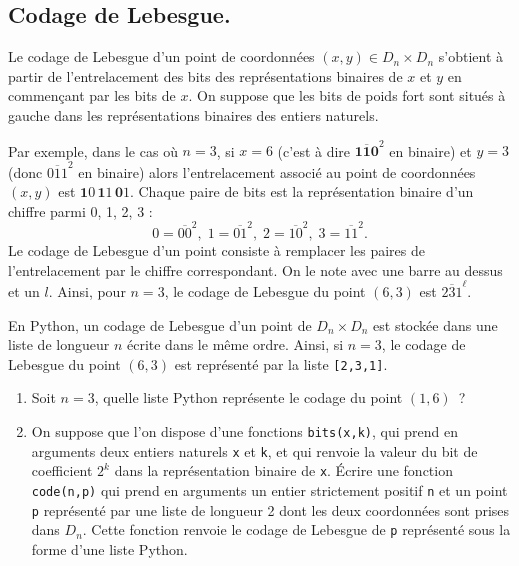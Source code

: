 \subsection{Codage de Lebesgue.}
Le codage de Lebesgue d'un point de coordonn\'ees $(x,y)\in D_n\times D_n$ s'obtient à partir de l'entrelacement des bits des repr\'esentations binaires de $x$ et $y$ en commençant par les bits de $x$.
On suppose que les bits de poids fort sont situ\'es \`a gauche dans les repr\'esentations binaires des entiers naturels.

Par exemple, dans le cas où $n=3$, si $x = 6$ (c'est à dire $\overline{\mathbf{110}}^2$ en binaire) et $y = 3$ (donc $\overline{011}^2$ en binaire) alors l'entrelacement associé au point de coordonn\'ees $(x,y)$ est $\mathbf{1}0\, \mathbf{1}1\, \mathbf{0}1$. \newline
Chaque paire de bits est la représentation binaire d'un chiffre parmi 0, 1, 2, 3 :
\[
 0 = \overline{00}^2, \; 1 = \overline{01}^2, \; 2 = \overline{10}^2, \;  3 = \overline{11}^2.
\]
Le codage de Lebesgue d'un point consiste à remplacer les paires de l'entrelacement par le chiffre correspondant. On le note avec une barre au dessus et un $l$.\newline
Ainsi, pour $n=3$, le codage de Lebesgue du point $(6,3)$ est $\overline{231}^\ell$.

En Python, un codage de Lebesgue d'un point de $D_n\times D_n$ est stock\'ee dans une liste de longueur $n$ écrite dans le même ordre. Ainsi, si $n=3$, le codage de Lebesgue du point $(6,3)$ est repr\'esent\'e par la liste {\tt [2,3,1]}.

\begin{enumerate}[resume]
\item Soit $n=3$, quelle liste Python repr\'esente le codage du point $(1,6)$~?
\item On suppose que l'on dispose d'une fonctions {\tt bits(x,k)}, qui prend en arguments deux entiers naturels {\tt x} et {\tt k}, et qui renvoie la valeur du bit de coefficient $2^k$ dans la repr\'esentation binaire de {\tt x}.\newline
\'Ecrire une fonction {\tt code(n,p)} qui prend en arguments un entier strictement positif {\tt n} et un point {\tt p} repr\'esent\'e par une liste de longueur 2 dont les deux coordonn\'ees sont prises dans $D_n$.
Cette fonction renvoie le codage de Lebesgue de {\tt p} repr\'esent\'e sous la forme d'une liste Python.
\end{enumerate}

